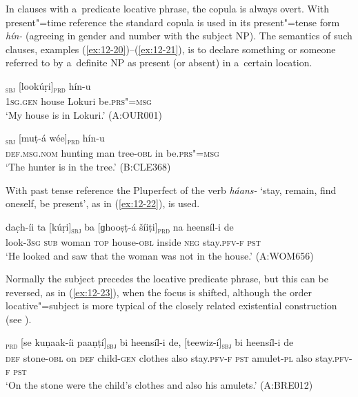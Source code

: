 In clauses with a~predicate locative phrase, the copula is always overt. With present"=time reference the standard copula is used in its present"=tense form \textit{hín-} (agreeing in gender and number with the subject NP). The semantics of such clauses, examples (\ref{ex:12-20})--(\ref{ex:12-21}), is to declare something or someone referred to by a~definite NP as present (or absent) in a~certain location.

\begin{exe}
\ex
\label{ex:12-20}
\textsubscript{\textsc{sbj}} [lookúṛi]\textsubscript{\textsc{prd}} hín-u \\
\textsc{1sg.gen} house Lokuri be.\textsc{prs"=msg} \\
\glt `My house is in Lokuri.' (A:OUR001)
\end{exe}
\begin{exe}
\ex
\label{ex:12-21}
\textsubscript{\textsc{sbj}} [muṭ-á wée]\textsubscript{\textsc{prd}} hín-u \\
\textsc{def.msg.nom} hunting man tree-\textsc{obl} in be.\textsc{prs"=msg} \\
\glt `The hunter is in the tree.' (B:CLE368)
\end{exe}

With past tense reference the Pluperfect of the verb \textit{háans-} `stay, remain, find oneself, be present', as in (\ref{ex:12-22}), is used.

\begin{exe}
\ex
\label{ex:12-22}
\gll dac̣h-íi ta [kúṛi]\textsubscript{\textsc{sbj}} ba [ɡhooṣṭ-á šíiṭi]\textsubscript{\textsc{prd}} na heensíl-i de \\
look-3\textsc{sg} \textsc{sub} woman \textsc{top} house-\textsc{obl} inside \textsc{neg} stay.\textsc{pfv-f} \textsc{pst} \\
\glt `He looked and saw that the woman was not in the house.' (A:WOM656)
\end{exe}

Normally the subject precedes the locative predicate phrase, but this can be reversed, as in (\ref{ex:12-23}), when the focus is shifted, although the order locative"=subject is more typical of the closely related existential construction (see ).

\begin{exe}
\ex
\label{ex:12-23}
\textsubscript{\textsc{prd}} [se kuṇaak-íi paaṇṭí]\textsubscript{\textsc{sbj}} bi heensíl-i de, [teewiz-í]\textsubscript{\textsc{sbj}} bi heensíl-i de \\
\textsc{def} stone-\textsc{obl} on \textsc{def} child-\textsc{gen} clothes  also stay.\textsc{pfv-f}
\textsc{pst} amulet-\textsc{pl} also stay.\textsc{pfv-f} \textsc{pst} \\
\glt `On the stone were the child's clothes and also his amulets.' (A:BRE012)
\end{exe}

